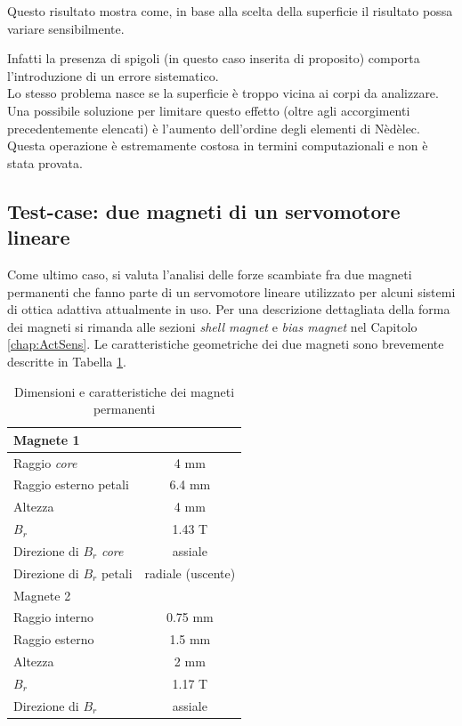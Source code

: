 Questo risultato mostra come, in base alla scelta della superficie il risultato possa variare sensibilmente.

Infatti la presenza di spigoli (in questo caso inserita di proposito) comporta  l'introduzione di un errore sistematico.\\

Lo stesso problema nasce se la superficie è troppo vicina ai corpi da analizzare. Una possibile soluzione per limitare questo effetto (oltre agli accorgimenti precedentemente elencati) è l'aumento dell'ordine degli elementi di Nèdèlec. Questa operazione  è estremamente costosa in termini computazionali e non è stata provata.


\subsection{Test-case: due magneti di un servomotore lineare}
Come ultimo caso, si valuta l'analisi delle forze scambiate fra due magneti permanenti che fanno parte di un servomotore lineare utilizzato per alcuni sistemi di ottica adattiva attualmente in uso. Per una descrizione dettagliata della forma dei magneti si rimanda alle sezioni \textit{shell magnet} e \textit{bias magnet} nel Capitolo \ref{chap:ActSens}. Le caratteristiche geometriche dei due magneti sono brevemente descritte in Tabella \ref{tab:2shellbiasdata}. 

\begin{table}
\centering
\caption{Dimensioni e caratteristiche dei magneti permanenti}
\label{tab:2shellbiasdata}
\begin{tabular}{lc}
\toprule
Magnete 1  &\\
\midrule
Raggio \textit{core} &  4 mm\\
Raggio esterno petali & 6.4 mm\\
Altezza & 4 mm\\
$B_r$ & 1.43 T\\
Direzione di $B_r$ \textit{core} & assiale\\
Direzione di $B_r$ petali & radiale (uscente)\\
\midrule
Magnete 2 &\\
Raggio interno & 0.75 mm\\
Raggio esterno & 1.5 mm\\
Altezza & 2 mm\\
$B_r$ & 1.17 T\\
Direzione di $B_r$ & assiale\\
\bottomrule
\end{tabular}
\end{table}

